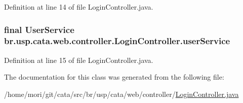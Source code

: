 Definition at line 14 of file Login\+Controller.\+java.

\hypertarget{classbr_1_1usp_1_1cata_1_1web_1_1controller_1_1_login_controller_a2dacb5d4b34c9f391816635064dbc0fd}{
\subsubsection[{user\+Service}]{\setlength{\rightskip}{0pt plus 5cm}final {\bf User\+Service} br.\+usp.\+cata.\+web.\+controller.\+Login\+Controller.\+user\+Service\hspace{0.3cm}{\ttfamily [private]}}}\label{classbr_1_1usp_1_1cata_1_1web_1_1controller_1_1_login_controller_a2dacb5d4b34c9f391816635064dbc0fd}


Definition at line 15 of file Login\+Controller.\+java.



The documentation for this class was generated from the following file\+:\begin{DoxyCompactItemize}
\item 
/home/mori/git/cata/src/br/usp/cata/web/controller/\hyperlink{_login_controller_8java}{Login\+Controller.\+java}\end{DoxyCompactItemize}
